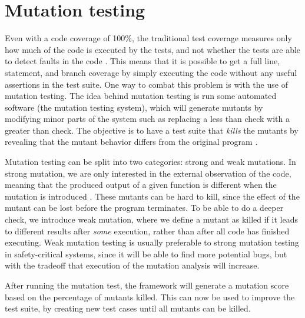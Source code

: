 \section{Mutation testing}
Even with a code coverage of 100\%, the traditional test coverage measures only how much of the code is executed by the tests, and not whether the tests are able to detect faults in the code \cite{pitest}.
This means that it is possible to get a full line, statement, and branch coverage by simply executing the code without any useful assertions in the test suite.
One way to combat this problem is with the use of mutation testing.
The idea behind mutation testing is run some automated software (the mutation testing system), which will generate mutants by modifying minor parts of the system such as replacing a less than check with a greater than check.
The objective is to have a test suite that \textit{kills} the mutants by revealing that the mutant behavior differs from the original program \cite{mutationtesting}.

Mutation testing can be split into two categories: strong and weak mutations.
In strong mutation, we are only interested in the external observation of the code, meaning that the produced output of a given function is different when the mutation is introduced \cite{mutationtesting}.
These mutants can be hard to kill, since the effect of the mutant can be lost before the program terminates.
To be able to do a deeper check, we introduce weak mutation, where we define a mutant as killed if it leads to different results after \textit{some} execution, rather than after all code has finished executing.
Weak mutation testing is usually preferable to strong mutation testing in safety-critical systems, since it will be able to find more potential bugs, but with the tradeoff that execution of the mutation analysis will increase.

After running the mutation test, the framework will generate a mutation score based on the percentage of mutants killed.
This can now be used to improve the test suite, by creating new test cases until all mutants can be killed.
